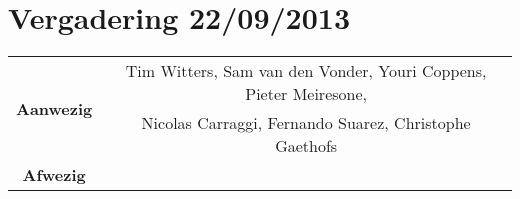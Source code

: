 \section{Vergadering 22/09/2013}

\begin{table}[htbp]
	\centering
	\begin{tabular}{c|c}
		\multirow{2}{*}{\textbf{Aanwezig}} & Tim Witters, Sam van den Vonder, Youri Coppens, Pieter Meiresone, \\
		& Nicolas Carraggi,  Fernando Suarez, Christophe Gaethofs \\
		\hline
		\textbf{Afwezig} &  \\
	\end{tabular}
\end{table}
\\

